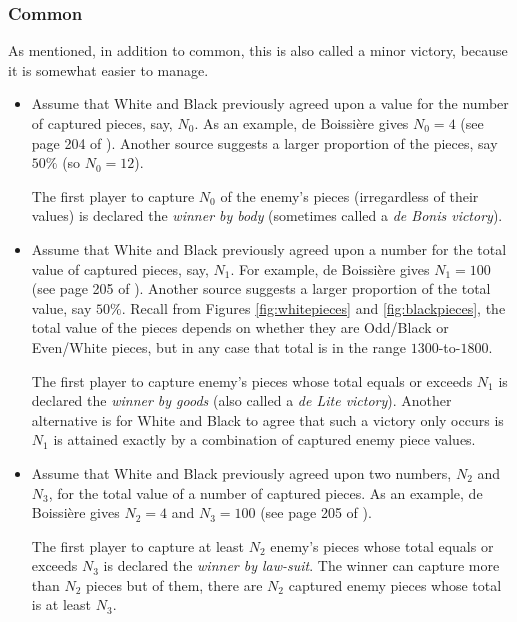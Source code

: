 \documentclass[12pt]{article}
\begin{document}
\subsubsection{Common}

As mentioned, in addition to common, this is also called a minor victory,
because it is somewhat easier to manage.

\begin{itemize}
\item
Assume that White and Black previously agreed upon a value for the
number of captured pieces, say, $N_0$. As an example, de Boissi\`ere
gives $N_0=4$ (see page 204 of \cite{Ri46}). Another source suggests
a larger proportion of the pieces, say $50\%$ (so $N_0 = 12$).

The first player to capture $N_0$ of the enemy's pieces (irregardless of their
values) is declared the {\it winner by body}
(sometimes called a {\it de Bonis victory}).

\item
Assume that White and Black previously agreed upon a number for the
total value of captured pieces, say, $N_1$. For example, de Boissi\`ere
gives $N_1=100$ (see page 205 of \cite{Ri46}). Another source suggests
a larger proportion of the total value, say $50 \%$.
Recall from Figures \ref{fig:whitepieces} and \ref{fig:blackpieces},
the total value of the pieces depends
on whether they are Odd/Black or Even/White pieces,
but in any case that total is in the range $1300$-to-$1800$.

The first player to capture enemy's pieces whose total
equals
or exceeds $N_1$ is declared the {\it winner by goods}
(also called a {\it de Lite victory}).
Another alternative is for White and Black to agree
that such a victory only occurs is $N_1$ is attained exactly by
a combination of captured enemy piece values.

\item
Assume that White and Black previously agreed upon two
numbers, $N_2$ and $N_3$, for the total value of a number of
captured pieces. As an example, de Boissi\`ere
gives $N_2=4$ and $N_3=100$ (see page 205 of \cite{Ri46}).

The first player to capture at least $N_2$ enemy's pieces whose total
equals or exceeds $N_3$ is declared the {\it winner by law-suit}.
The winner can capture more than $N_2$ pieces but of them,
there are $N_2$ captured enemy pieces whose total is
at least $N_3$.


\end{itemize}
\end{document}
